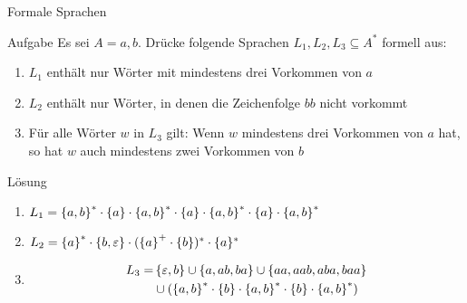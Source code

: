 
\begin{frame}{Formale Sprachen}
	\begin{exampleblock}{Aufgabe}
		Es sei $A = {a,b}$. Drücke folgende Sprachen $L_1, L_2, L_3 \subseteq A^*$ formell aus:
		\begin{enumerate}
			\item $L_1$ enthält nur Wörter mit mindestens drei Vorkommen von $a$
			\item $L_2$ enthält nur Wörter, in denen die Zeichenfolge $bb$ nicht vorkommt
			\item Für alle Wörter $w$ in $L_3$ gilt: Wenn $w$ mindestens drei Vorkommen von $a$ hat, so hat $w$ auch mindestens zwei Vorkommen von $b$ 
		\end{enumerate}
	\end{exampleblock}
	\pause
	\begin{block}{Lösung}
		\begin{enumerate}
			\item $L_1 = \left\{ a,b \right\}^\ast \cdot \left\{ a \right\} \cdot \left\{ a,b \right\}^\ast \cdot \left\{ a \right\} \cdot \left\{ a,b \right\}^\ast \cdot \left\{ a \right\} \cdot \left\{ a,b \right\}^\ast$
			\item $L_2 = \left\{ a \right\}^\ast \cdot \left\{ b, \varepsilon \right\} \cdot (\left\{ a \right\}^+ \cdot \left\{ b \right\})^\ast \cdot \{ a \}^*$ 
			\item \begin{align*}L_3 = & \left\{ \varepsilon,b \right\} \cup \left\{ a, ab, ba \right\} \cup \left\{ aa, aab, aba, baa \right\} \\ & \cup (\left\{ a,b \right\}^\ast \cdot \left\{ b \right\} \cdot \left\{ a,b \right\}^\ast \cdot \left\{ b \right\} \cdot \left\{ a,b \right\}^\ast) \end{align*}
		\end{enumerate}
	\end{block}
\end{frame}